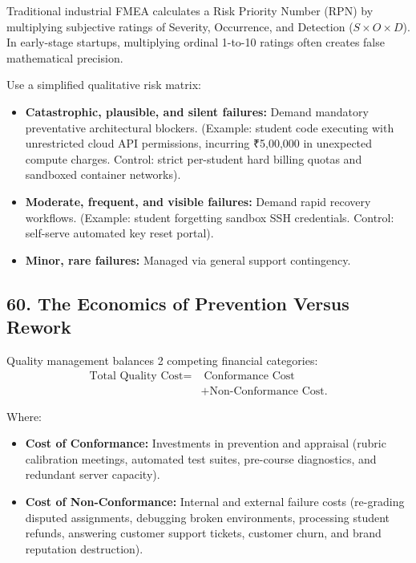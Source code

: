 Traditional industrial FMEA calculates a Risk Priority Number (RPN) by multiplying subjective ratings of Severity, Occurrence, and Detection ($S \times O \times D$). In early-stage startups, multiplying ordinal 1-to-10 ratings often creates false mathematical precision.

Use a simplified qualitative risk matrix:
\begin{itemize}
    \item \textbf{Catastrophic, plausible, and silent failures:} Demand mandatory preventative architectural blockers. (Example: student code executing with unrestricted cloud API permissions, incurring ₹5,00,000 in unexpected compute charges. Control: strict per-student hard billing quotas and sandboxed container networks).
    \item \textbf{Moderate, frequent, and visible failures:} Demand rapid recovery workflows. (Example: student forgetting sandbox SSH credentials. Control: self-serve automated key reset portal).
    \item \textbf{Minor, rare failures:} Managed via general support contingency.
\end{itemize}

\subsection*{60. The Economics of Prevention Versus Rework}

Quality management balances 2 competing financial categories:
\begin{equation}
\begin{aligned}
\text{Total Quality Cost} = &\;\text{Conformance Cost} \\
&+ \text{Non-Conformance Cost}.
\end{aligned}
\end{equation}

Where:
\begin{itemize}
    \item \textbf{Cost of Conformance:} Investments in prevention and appraisal (rubric calibration meetings, automated test suites, pre-course diagnostics, and redundant server capacity).
    \item \textbf{Cost of Non-Conformance:} Internal and external failure costs (re-grading disputed assignments, debugging broken environments, processing student refunds, answering customer support tickets, customer churn, and brand reputation destruction).
\end{itemize}


